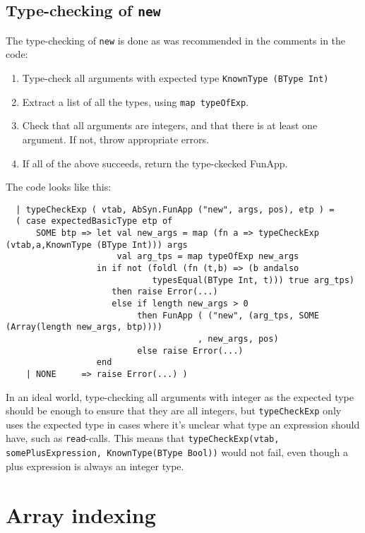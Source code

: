 \documentclass{article}
\begin{document}
\subsection{Type-checking of \texttt{new}}
The type-checking of \texttt{new} is done as was recommended in the comments in the code:

\begin{enumerate}
    \item Type-check all arguments with expected type \texttt{KnownType (BType Int)}
    \item Extract a list of all the types, using \texttt{map typeOfExp}.
    \item Check that all arguments are integers, and that there is at least one argument. If not, throw appropriate errors.
    \item If all of the above succeeds, return the type-ckecked FunApp.
\end{enumerate}

The code looks like this:
\begin{lstlisting}
  | typeCheckExp ( vtab, AbSyn.FunApp ("new", args, pos), etp ) =
  ( case expectedBasicType etp of
      SOME btp => let val new_args = map (fn a => typeCheckExp (vtab,a,KnownType (BType Int))) args
                      val arg_tps = map typeOfExp new_args
                  in if not (foldl (fn (t,b) => (b andalso
                             typesEqual(BType Int, t))) true arg_tps)
                     then raise Error(...)
                     else if length new_args > 0
                          then FunApp ( ("new", (arg_tps, SOME (Array(length new_args, btp))))
                                      , new_args, pos)
                          else raise Error(...)
                  end
    | NONE     => raise Error(...) )
\end{lstlisting}

In an ideal world, type-checking all arguments with integer as the expected type should be enough to ensure that they are all integers, but \texttt{typeCheckExp} only uses the expected type in cases where it's unclear what type an expression should have, such as \texttt{read}-calls. This means that \texttt{typeCheckExp(vtab, somePlusExpression, KnownType(BType Bool))} would not fail, even though a plus expression is always an integer type.

\section{Array indexing}
\end{document}
